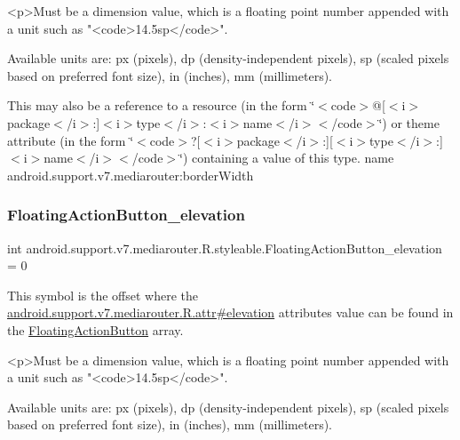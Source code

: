 \begin{DoxyVerb}      <p>Must be a dimension value, which is a floating point number appended with a unit such as "<code>14.5sp</code>".
\end{DoxyVerb}
 Available units are\+: px (pixels), dp (density-\/independent pixels), sp (scaled pixels based on preferred font size), in (inches), mm (millimeters). 

This may also be a reference to a resource (in the form \char`\"{}$<$code$>$@\mbox{[}$<$i$>$package$<$/i$>$\+:\mbox{]}$<$i$>$type$<$/i$>$\+:$<$i$>$name$<$/i$>$$<$/code$>$\char`\"{}) or theme attribute (in the form \char`\"{}$<$code$>$?\mbox{[}$<$i$>$package$<$/i$>$\+:\mbox{]}\mbox{[}$<$i$>$type$<$/i$>$\+:\mbox{]}$<$i$>$name$<$/i$>$$<$/code$>$\char`\"{}) containing a value of this type.  name android.\+support.\+v7.\+mediarouter\+:border\+Width \mbox{\label{classandroid_1_1support_1_1v7_1_1mediarouter_1_1R_1_1styleable_a825fd6ef93b166b8df535e4b2bef49ba}} 
\subsubsection{\texorpdfstring{Floating\+Action\+Button\+\_\+elevation}{FloatingActionButton\_elevation}}
{\footnotesize\ttfamily int android.\+support.\+v7.\+mediarouter.\+R.\+styleable.\+Floating\+Action\+Button\+\_\+elevation = 0\hspace{0.3cm}{\ttfamily [static]}}

This symbol is the offset where the \hyperlink{classandroid_1_1support_1_1v7_1_1mediarouter_1_1R_1_1attr_ab1ec64066729d67ab6ae697dc2178d06}{android.\+support.\+v7.\+mediarouter.\+R.\+attr\#elevation} attribute\textquotesingle{}s value can be found in the \hyperlink{classandroid_1_1support_1_1v7_1_1mediarouter_1_1R_1_1styleable_ae665bad1758a0b708ec034929b76af91}{Floating\+Action\+Button} array.

\begin{DoxyVerb}      <p>Must be a dimension value, which is a floating point number appended with a unit such as "<code>14.5sp</code>".
\end{DoxyVerb}
 Available units are\+: px (pixels), dp (density-\/independent pixels), sp (scaled pixels based on preferred font size), in (inches), mm (millimeters). 

